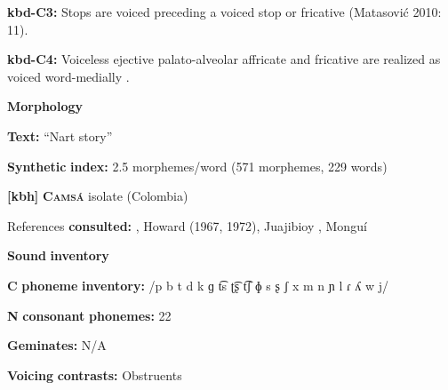 \begin{styleBody}
\textbf{kbd-C3:} Stops are voiced preceding a voiced stop or fricative (Matasović 2010: 11).
\end{styleBody}

\begin{styleBody}
\textbf{kbd-C4:} Voiceless ejective palato-alveolar affricate and fricative are realized as voiced word-medially \citep[19]{Kuipers1960}.
\end{styleBody}

\begin{styleBody}
\textbf{Morphology}
\end{styleBody}

\begin{styleBody}
\textbf{Text:} “Nart story” \citep[223-231]{Applebaum2013}
\end{styleBody}

\begin{styleBody}
\textbf{Synthetic} \textbf{index:} 2.5 morphemes/word (571 morphemes, 229 words)
\end{styleBody}

\begin{styleBody}
\textbf{[kbh]}   \textbf{\textsc{Camsá}}  isolate (Colombia)
\end{styleBody}

\begin{styleBody}
References \textbf{consulted:} \citet{Fabre2002}, Howard (1967, 1972), Juajibioy \citet{Chindoy1962}, Monguí \citet{Sánchez1981}
\end{styleBody}

\begin{styleBody}
\textbf{Sound} \textbf{inventory}
\end{styleBody}

\begin{styleBody}
\textbf{C} \textbf{phoneme} \textbf{inventory:} /p b t d k ɡ t͡s ʈ͡ʂ t͡ʃ ɸ s ʂ ʃ x m n ɲ l ɾ ʎ w j/
\end{styleBody}

\begin{styleBody}
\textbf{N} \textbf{consonant} \textbf{phonemes:} 22
\end{styleBody}

\begin{styleBody}
\textbf{Geminates:} N/A
\end{styleBody}

\begin{styleBody}
\textbf{Voicing} \textbf{contrasts:} Obstruents
\end{styleBody}

